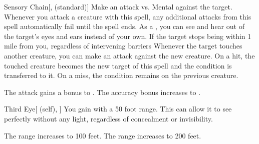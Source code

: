 \lowercase{\hypertarget{spell:Sensory Chain}{}}\label{spell:Sensory Chain}
\begin{freeability}[Rank 4]{\hypertarget{spell:Sensory Chain}{Sensory Chain}}[,  (standard)]
Make an attack vs. Mental against the target.
Whenever you attack a creature with this spell, any additional attacks from this spell automatically fail until the spell ends.
\hit As a , you can see and hear out of the target's eyes and ears instead of your own.
If the target stops being within 1 mile from you, regardless of intervening barriers
Whenever the target touches another creature, you can make an attack against the new creature.
On a hit, the touched creature becomes the new target of this spell and the condition is transferred to it.
On a miss, the condition remains on the previous creature.


\rankline
{} The attack gains a  bonus to .
 The accuracy bonus increases to .
\end{freeability}
\vspace{0.25em}



\lowercase{\hypertarget{spell:Third Eye}{}}\label{spell:Third Eye}
\begin{attuneability}[Rank 4]{\hypertarget{spell:Third Eye}{Third Eye}}[ (self), ]
You gain  with a 50 foot range.
This can allow it to see perfectly without any light, regardless of concealment or invisibility.

\rankline
{} The range increases to 100 feet.
 The range increases to 200 feet.
\end{attuneability}
\vspace{0.25em}




